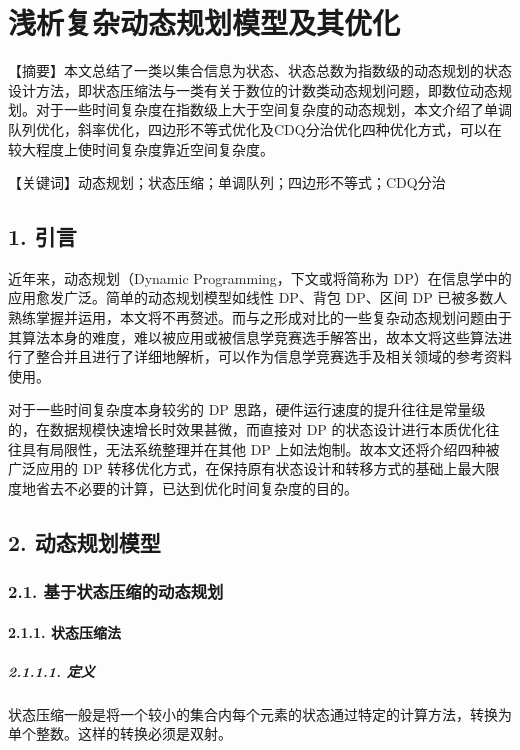 \section{浅析复杂动态规划模型及其优化}

【摘要】本文总结了一类以集合信息为状态、状态总数为指数级的动态规划的状态设计方法，即状态压缩法与一类有关于数位的计数类动态规划问题，即数位动态规划。对于一些时间复杂度在指数级上大于空间复杂度的动态规划，本文介绍了单调队列优化，斜率优化，四边形不等式优化及CDQ分治优化四种优化方式，可以在较大程度上使时间复杂度靠近空间复杂度。

【关键词】动态规划；状态压缩；单调队列；四边形不等式；CDQ分治

\subsection{1. 引言}

近年来，动态规划（Dynamic Programming，下文或将简称为
DP）在信息学中的应用愈发广泛。简单的动态规划模型如线性 DP、背包 DP、区间
DP
已被多数人熟练掌握并运用，本文将不再赘述。而与之形成对比的一些复杂动态规划问题由于其算法本身的难度，难以被应用或被信息学竞赛选手解答出，故本文将这些算法进行了整合并且进行了详细地解析，可以作为信息学竞赛选手及相关领域的参考资料使用。

对于一些时间复杂度本身较劣的 DP
思路，硬件运行速度的提升往往是常量级的，在数据规模快速增长时效果甚微，而直接对
DP 的状态设计进行本质优化往往具有局限性，无法系统整理并在其他 DP
上如法炮制。故本文还将介绍四种被广泛应用的 DP
转移优化方式，在保持原有状态设计和转移方式的基础上最大限度地省去不必要的计算，已达到优化时间复杂度的目的。

\subsection{2. 动态规划模型}

\subsubsection{2.1. 基于状态压缩的动态规划}

\paragraph{2.1.1. 状态压缩法}

\subparagraph{2.1.1.1. 定义}

状态压缩一般是将一个较小的集合内每个元素的状态通过特定的计算方法，转换为单个整数。这样的转换必须是双射。

